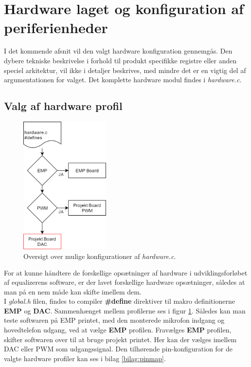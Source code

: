 \section{Hardware laget og konfiguration af periferienheder}
I det kommende afsnit vil den valgt hardware konfiguration gennemgås. 
Den dybere tekniske beskrivelse i forhold til produkt specifikke registre eller anden speciel arkitektur, vil ikke i detaljer beskrives, med mindre det er en vigtig del af argumentationen for valget.
Det komplette hardware modul findes i \emph{hardware.c}.

\subsection{Valg af hardware profil}
\begin{figure}
	\centering
	\includegraphics[width=4.5cm]{billeder/hardware_profiles.png}
	\caption{Oversigt over mulige konfigurationer af \textit{hardware.c}.}
	\label{fig:hardware_profiler}
\end{figure}
For at kunne håndtere de forskellige opsætninger af hardware i udviklingsforløbet af equalizerens software, er der lavet forskellige hardware opsætninger, således at man på en nem måde kan skifte imellem dem.
\\
I \textit{global.h} filen, findes to compiler \textbf{\#define} direktiver til makro definitionerne \textbf{EMP} og \textbf{DAC}.
Sammenhænget mellem profilerne ses i figur \ref{fig:hardware_profiler}. 
Således kan man teste softwaren på EMP printet, med den monterede mikrofon indgang og hovedtelefon udgang, ved at vælge \textbf{EMP} profilen.
Fravælges \textbf{EMP} profilen, skifter softwaren over til at bruge projekt printet.
Her kan der vælges imellem DAC eller PWM som udgangssignal.  
Den tilhørende pin-konfiguration for de valgte hardware profiler kan ses i bilag \ref{bilag:pinmap}.


